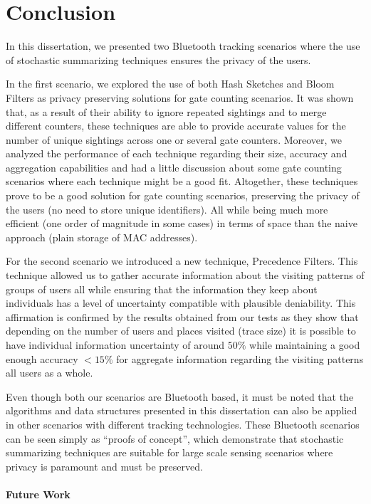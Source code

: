 \chapter{Conclusion}
\label{cha:conclusion}

In this dissertation, we presented two Bluetooth tracking scenarios
where the use of stochastic summarizing techniques ensures the privacy
of the users.

In the first scenario, we explored the use of both Hash Sketches and
Bloom Filters as privacy preserving solutions for gate counting
scenarios.  It was shown that, as a result of their ability to ignore
repeated sightings and to merge different counters, these techniques
are able to provide accurate values for the number of unique sightings
across one or several gate counters.  Moreover, we analyzed the
performance of each technique regarding their size, accuracy and
aggregation capabilities and had a little discussion about some gate
counting scenarios where each technique might be a good
fit. Altogether, these techniques prove to be a good solution for gate
counting scenarios, preserving the privacy of the users (no need to
store unique identifiers). All while being much more efficient (one
order of magnitude in some cases) in terms of space than the naive
approach (plain storage of MAC addresses).


For the second scenario we introduced a new technique, Precedence
Filters. This technique allowed us to gather accurate information
about the visiting patterns of groups of users all while ensuring that
the information they keep about individuals has a level of uncertainty
compatible with plausible deniability.  This affirmation is confirmed
by the results obtained from our tests as they show that depending on
the number of users and places visited (trace size) it is possible to
have individual information uncertainty of around $50\%$ while
maintaining a good enough accuracy $  <15\%$ for aggregate information
regarding the visiting patterns all users as a whole.


Even though both our scenarios are Bluetooth based, it must be noted
that the algorithms and data structures presented in this dissertation
can also be applied in other scenarios with different tracking
technologies. These Bluetooth scenarios can be seen simply as ``proofs of
concept'', which demonstrate that stochastic summarizing techniques are
suitable for large scale sensing scenarios where privacy is paramount
and must be preserved.


\subsubsection{Future Work}
\label{sec:future-work}

